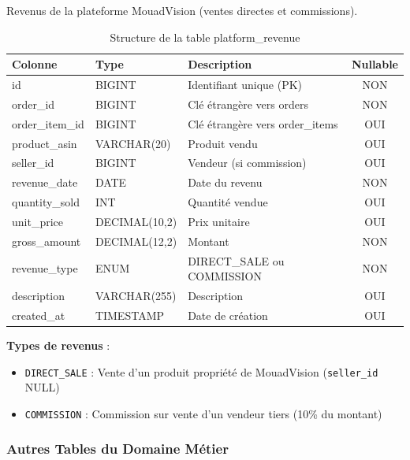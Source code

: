\documentclass[12pt,a4paper]{report}
\begin{document}
Revenus de la plateforme MouadVision (ventes directes et commissions).

\begin{table}[H]
    \centering
    \caption{Structure de la table platform\_revenue}
    \begin{tabularx}{\textwidth}{llXc}
        \toprule
        \textbf{Colonne} & \textbf{Type} & \textbf{Description} & \textbf{Nullable} \\
        \midrule
        id & BIGINT & Identifiant unique (PK) & NON \\
        order\_id & BIGINT & Clé étrangère vers orders & NON \\
        order\_item\_id & BIGINT & Clé étrangère vers order\_items & OUI \\
        product\_asin & VARCHAR(20) & Produit vendu & OUI \\
        seller\_id & BIGINT & Vendeur (si commission) & OUI \\
        revenue\_date & DATE & Date du revenu & NON \\
        quantity\_sold & INT & Quantité vendue & OUI \\
        unit\_price & DECIMAL(10,2) & Prix unitaire & OUI \\
        gross\_amount & DECIMAL(12,2) & Montant & NON \\
        revenue\_type & ENUM & DIRECT\_SALE ou COMMISSION & NON \\
        description & VARCHAR(255) & Description & OUI \\
        created\_at & TIMESTAMP & Date de création & OUI \\
        \bottomrule
    \end{tabularx}
    \label{tab:platform_revenue}
\end{table}

\textbf{Types de revenus} :
\begin{itemize}[noitemsep]
    \item \texttt{DIRECT\_SALE} : Vente d'un produit propriété de MouadVision (\texttt{seller\_id} NULL)
    \item \texttt{COMMISSION} : Commission sur vente d'un vendeur tiers (10\% du montant)
\end{itemize}

\subsubsection{Autres Tables du Domaine Métier}
\end{document}
